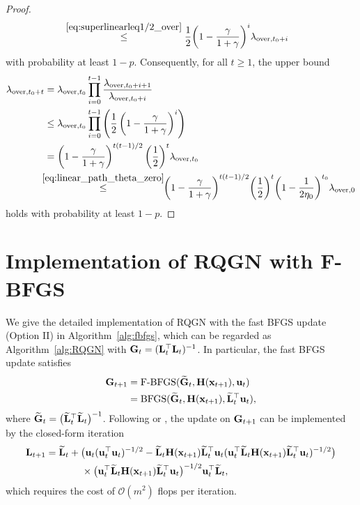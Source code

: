 \documentclass[11pt]{article}
\theoremstyle{plain}
\theoremstyle{definition}
\theoremstyle{remark}
\theoremstyle{plain}
\def\mG {{\bf G}}
\def\G{{\bf G}}
\def\H{{\bf H}}
\def\u{{\bf u}}
\def\x{{\bf x}}
\def\OM{{\mathcal O}}
\def \bfgs{{\text{\rm BFGS}}}
\def \fbfgs{{\text{\rm F-BFGS}}}
\def \L{{\bf L}}
\begin{document}
\begin{proof}
\begin{align*}
&\overset{\eqref{eq:superlinearleq1/2_over}}{\leq}
\frac{1}{2}\biggl(1-\frac{\gamma}{1+\gamma}\biggr)^i
\lambda_{\mathrm{over},t_0+i}
\end{align*}
with probability at least $1-p$. 
Consequently, for all $t\geq1$, the upper bound
\begin{align*}
\lambda_{\mathrm{over},t_0+t}
&=\lambda_{\mathrm{over},t_0}
\prod_{i=0}^{t-1}
\frac{\lambda_{\mathrm{over},t_0+i+1}}
{\lambda_{\mathrm{over},t_0+i}}\\
&\leq\lambda_{\mathrm{over},t_0}
\prod_{i=0}^{t-1}\left(\frac{1}{2}
\left(1-\frac{\gamma}{1+\gamma}\right)^i\right)\\
&=\left(1-\frac{\gamma}{1+\gamma}\right)^{t(t-1)/2}
\biggl(\frac{1}{2}\biggr)^t\lambda_{\mathrm{over},t_0}\\
&\!\!\!\overset{\eqref{eq:linear_path_theta_zero}}{\leq}\!\!
\biggl(1-\frac{\gamma}{1+\gamma}\biggr)^{t(t-1)/2}
\biggl(\frac{1}{2}\biggr)^t
\biggl(1-\frac{1}{2\eta_0}\biggr)^{t_0}
\lambda_{\mathrm{over},0}
\end{align*}
holds with probability at least $1-p$.
\end{proof}

\section{Implementation of RQGN with F-BFGS}
\label{app:fbfgs}

We give the detailed implementation of RQGN with the fast BFGS update (Option II) in Algorithm~\ref{alg:fbfgs}, 
which can be regarded as Algorithm~\ref{alg:RQGN} with $\G_t=(\L_t^{\top}\L_t)^{-1}$. In particular, the fast BFGS update satisfies
\begin{align*}
\G_{t+1}
&=\fbfgs(\widetilde{\G}_t,\H(\x_{t+1}),\u_t) \\
&=\bfgs(\widetilde{\G}_t,\H(\x_{t+1}),\widetilde{\L}_t^{\top}\u_t),
\end{align*}
where $\widetilde{\G}_t=\big(\widetilde{\L}_t^{\top}\widetilde{\L}_t\big)^{-1}$.
Following \citet[Proposition~5.7]{liu2023symmetric} or \citet[Equation~(9.11)]{gower2017randomized}, the update on $\mG_{t+1}$ can be implemented by the closed-form iteration 
\begin{align*}
\L_{t+1}={}&\widetilde{\L}_t+
\big(\u_t(\u_t^\top\u_t)^{-1/2}
-\widetilde{\L}_t\H(\x_{t+1})\widetilde{\L}_t^\top\u_t
(\u_t^\top\widetilde{\L}_t\H(\x_{t+1})\widetilde{\L}_t^\top\u_t)^{-1/2}\big)\\
&~\quad\quad\times
\big(\u_t^\top\widetilde{\L}_t\H(\x_{t+1})\widetilde{\L}_t^\top\u_t\big)^{-1/2}
\u_t^\top\widetilde{\L}_t,
\end{align*}
which requires the cost of $\OM(m^2)$ flops per iteration.
\end{document}
